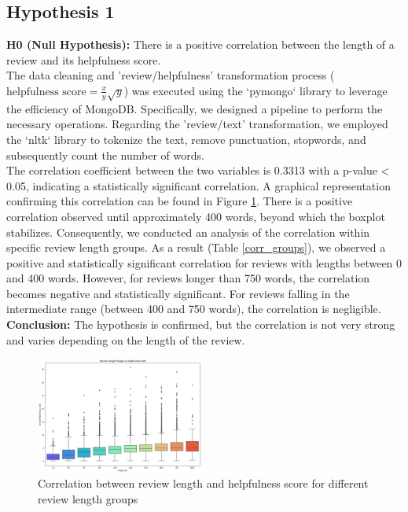 \subsection*{Hypothesis 1}

\textbf{H0 (Null Hypothesis):} There is a positive correlation between the length of a review and its helpfulness score.\\
\noindent
The data cleaning and 'review/helpfulness' transformation process ($\text{helpfulness score} = \frac{x}{y} \sqrt{y}$) was executed using the `pymongo` library to leverage the efficiency of MongoDB. 
Specifically, we designed a pipeline to perform the necessary operations. Regarding the 'review/text' transformation, we employed the `nltk` 
library to tokenize the text, remove punctuation, stopwords, and subsequently count the number of words.\\
The correlation coefficient between the two variables is 0.3313 with a p-value < 0.05, indicating a statistically significant correlation.
A graphical representation confirming this correlation can be found in Figure \ref{fig:h1_boxplot}. There is a positive correlation observed until 
approximately 400 words, beyond which the boxplot stabilizes. Consequently, we conducted an analysis of the correlation within specific review length 
groups. As a result (Table \ref{corr_groups}), we observed a positive and statistically significant correlation for reviews with lengths between 0 and 400 words. 
However, for reviews longer than 750 words, the correlation becomes negative and statistically significant. For reviews falling in the intermediate range 
(between 400 and 750 words), the correlation is negligible.
\noindent
\textbf{Conclusion:} The hypothesis is confirmed, but the correlation is not very strong and varies depending on the length of the review.

\begin{figure}[H]
    \centering
    \includegraphics[width=0.49\textwidth]{./figures/h1_boxplot.png}
    \caption{Correlation between review length and helpfulness score for different review length groups}
    \label{fig:h1_boxplot}
\end{figure}

